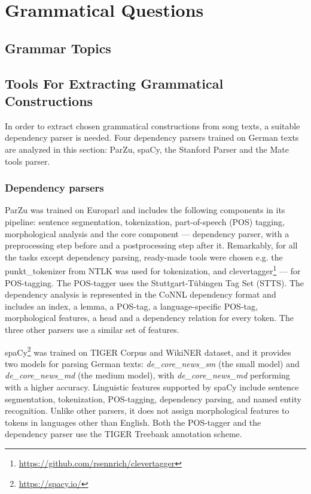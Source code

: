 \chapter{Grammatical Questions}
\label{sec:grammar}

\section{Grammar Topics}

\section{Tools For Extracting Grammatical Constructions}

In order to extract chosen grammatical constructions from song texts, a suitable dependency parser is needed. Four dependency parsers trained on German texts are analyzed in this section: ParZu, spaCy, the Stanford Parser and the Mate tools parser.

\subsection{Dependency parsers}

ParZu \citep{Rico.2009} was trained on Europarl and includes the following components in its pipeline: sentence segmentation, tokenization, part-of-speech (POS) tagging, morphological analysis and the core component --- dependency parser, with a preprocessing step before and a postprocessing step after it. Remarkably, for all the tasks except dependency parsing, ready-made tools were chosen e.g. the punkt\_tokenizer from NTLK was used for tokenization, and clevertagger\footnote{\url{https://github.com/rsennrich/clevertagger}} --- for POS-tagging. The POS-tagger uses the Stuttgart-Tübingen Tag Set (STTS). The dependency analysis is represented in the CoNNL dependency format and includes an index, a lemma, a POS-tag, a language-specific POS-tag, morphological features, a head and a dependency relation for every token. The three other parsers use a similar set of features.

spaCy\footnote{\url{https://spacy.io/}} was trained on TIGER Corpus and WikiNER dataset, and it provides two models for parsing German texts: \textit{de\_core\_news\_sm} (the small model) and \textit{de\_core\_news\_md} (the medium model), with \textit{de\_core\_news\_md} performing with a higher accuracy. Linguistic features supported by spaCy include sentence segmentation, tokenization, POS-tagging, dependency parsing, and named entity recognition. Unlike other parsers, it does not assign morphological features to tokens in languages other than English. Both the POS-tagger and the dependency parser use the TIGER Treebank annotation scheme.

